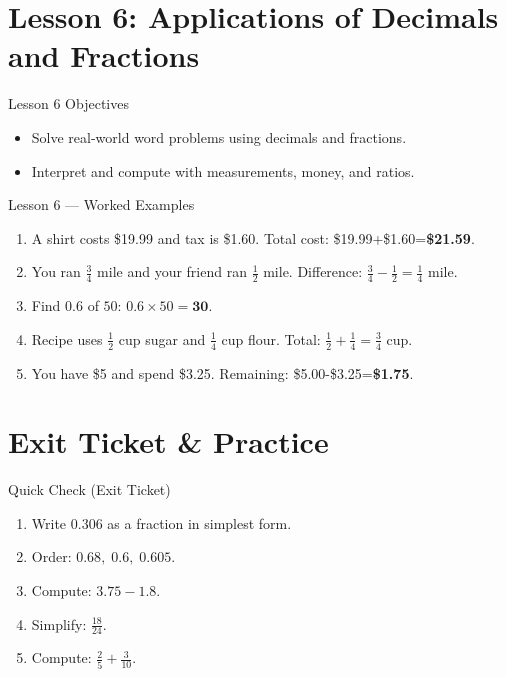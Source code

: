 \documentclass[aspectratio=169]{beamer}
\begin{document}
\section{Lesson 6: Applications of Decimals and Fractions}
\begin{frame}{Lesson 6 Objectives}
\begin{itemize}
  \item Solve real-world word problems using decimals and fractions.
  \item Interpret and compute with measurements, money, and ratios.
\end{itemize}
\end{frame}

\begin{frame}{Lesson 6 --- Worked Examples}
\begin{enumerate}
  \item A shirt costs \$19.99 and tax is \$1.60. Total cost: \$19.99+\$1.60=\textbf{\$21.59}.
  \item You ran $\frac{3}{4}$ mile and your friend ran $\frac{1}{2}$ mile. Difference: $\frac{3}{4}-\frac{1}{2}=\frac{1}{4}$ mile.
  \item Find $0.6$ of $50$: $0.6\times50=\textbf{30}$.
  \item Recipe uses $\frac{1}{2}$ cup sugar and $\frac{1}{4}$ cup flour. Total: $\frac{1}{2}+\frac{1}{4}=\frac{3}{4}$ cup.
  \item You have \$5 and spend \$3.25. Remaining: \$5.00-\$3.25=\textbf{\$1.75}.
\end{enumerate}
\end{frame}

\section{Exit Ticket \& Practice}
\begin{frame}{Quick Check (Exit Ticket)}
\begin{enumerate}
  \item Write $0.306$ as a fraction in simplest form.
  \item Order: $0.68,\;0.6,\;0.605$.
  \item Compute: $3.75-1.8$.
  \item Simplify: $\frac{18}{24}$.
  \item Compute: $\frac{2}{5}+\frac{3}{10}$.
\end{enumerate}
\end{frame}
\end{document}

